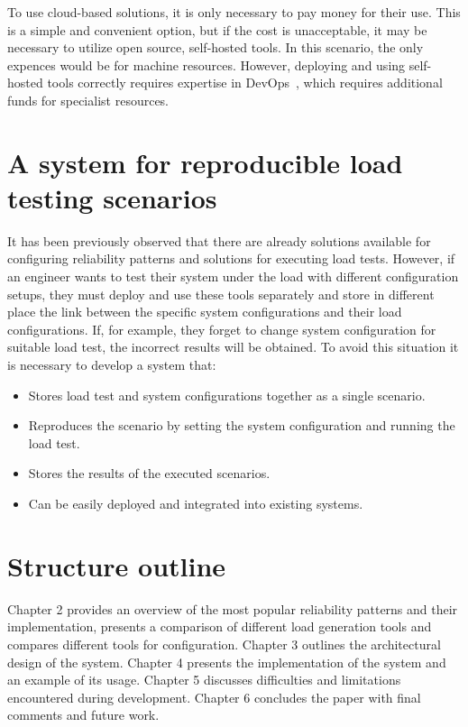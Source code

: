 To use cloud-based solutions, it is only necessary to pay money for their use. This is a simple and convenient option, but if the cost is unacceptable, it may be necessary to utilize open source, self-hosted tools. In this scenario, the only expences would be for machine resources. However, deploying and using self-hosted tools correctly requires expertise in DevOps~\cite{devops}, which requires additional funds for specialist resources.


\section{A system for reproducible load testing scenarios}\label{sec:purpose}
It has been previously observed that there are already solutions available for configuring reliability patterns and solutions for executing load tests. However, if an engineer wants to test their system under the load with different configuration setups, they must deploy and use these tools separately and store in different place the link between the specific system configurations and their load configurations. If, for example, they forget to change system configuration for suitable load test, the incorrect results will be obtained. To avoid this situation it is necessary to develop a system that:
\begin{itemize}
    \item Stores load test and system configurations together as a single scenario.
    \item Reproduces the scenario by setting the system configuration and running the load test.
    \item Stores the results of the executed scenarios.
    \item Can be easily deployed and integrated into existing systems.
\end{itemize}


\section{Structure outline}\label{sec:structure-outline}
Chapter 2 provides an overview of the most popular reliability patterns and their implementation, presents a comparison of different load generation tools and compares different tools for configuration. Chapter 3 outlines the architectural design of the system. Chapter 4 presents the implementation of the system and an example of its usage. Chapter 5 discusses difficulties and limitations encountered during development. Chapter 6 concludes the paper with final comments and future work.